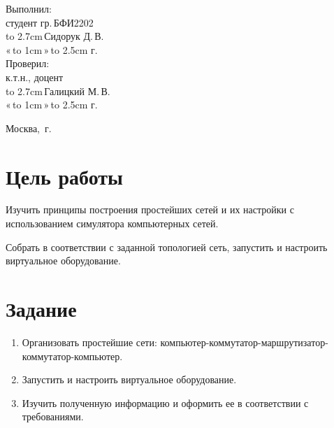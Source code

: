 \documentclass[14pt]{extarticle}
\makeatletter
\newcommand{\hrf}[1]{\hbox to #1{\hrulefill}} %
\newcounter{sectionc} %
\newcommand{\numbersections}{\renewcommand{\Hy@numberline}[1]{##1~}}
\newcommand{\nonumbersections}{\renewcommand{\Hy@numberline}[1]{}}
\let\oldsection\section
\renewcommand{\section}{\numbersections\oldsection}
\let\oldsectionc\sectionc
\renewcommand{\sectionc}{\nonumbersections\oldsectionc}
\renewcommand\tableofcontents{
	\pdfbookmark[sectionc]{\contentsname}{toc} %
	\sectionc*{\contentsname
		\@mkboth{\contentsname}{\contentsname}}
	\@starttoc{toc}
}
\makeatother
\begin{document}
\vfill %

\hfill %
\begin{minipage}{0.45\textwidth} %
	Выполнил:\\[2mm]
	студент гр.\,БФИ2202\\[2mm]
	\hrf{2.7cm}\,Сидорук Д.\,В.\\[2mm]
	«\,\hrf{1cm}\,»\,\hrf{2.5cm}\,\the\year{}\,г.\\[5mm]
	
	Проверил:\\[2mm]
	к.т.н., доцент\\[2mm]
	\hrf{2.7cm}\,Галицкий М.\,В.\\[2mm]
	«\,\hrf{1cm}\,»\,\hrf{2.5cm}\,\the\year{}\,г.
\end{minipage}%

\vfill

\centerline{Москва, \the\year{}\,г.} %
\thispagestyle{empty} %
\newpage %
\tableofcontents %
\newpage %

\section{Цель работы}

Изучить принципы построения простейших сетей и их настройки с использованием симулятора компьютерных сетей.

Собрать в соответствии с заданной топологией сеть, запустить и настроить виртуальное оборудование.

\section{Задание}

\begin{enumerate}
    \item Организовать простейшие сети: компьютер-коммутатор-маршрутизатор-коммутатор-компьютер.
    \item Запустить и настроить виртуальное оборудование.
    \item Изучить полученную информацию и оформить ее в соответствии с требованиями.
\end{enumerate}
\end{document}

